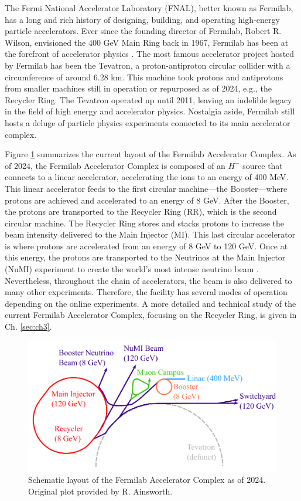 The Fermi National Accelerator Laboratory (FNAL), better known as Fermilab, has a long and rich history of designing, building, and operating high-energy particle accelerators. Ever since the founding director of Fermilab, Robert R. Wilson, envisioned the 400 GeV Main Ring back in 1967, Fermilab has been at the forefront of accelerator physics \cite{fermilab1,fermi50,tevatron}. The most famous accelerator project hosted by Fermilab has been the Tevatron, a proton-antiproton circular collider with a circumference of around 6.28 km. This machine took protons and antiprotons from smaller machines still in operation or repurposed as of 2024, e.g., the Recycler Ring. The Tevatron operated up until 2011, leaving an indelible legacy in the field of high energy and accelerator physics. Nostalgia aside, Fermilab still hosts a deluge of particle physics experiments connected to its main accelerator complex.      

Figure \ref{fig:fac} summarizes the current layout of the Fermilab Accelerator Complex. As of 2024, the Fermilab Accelerator Complex is composed of an $H^-$ source that connects to a linear accelerator, accelerating the ions to an energy of 400 MeV. This linear accelerator feeds to the first circular machine---the Booster---where protons are achieved and accelerated to an energy of 8 GeV. After the Booster, the protons are transported to the Recycler Ring (RR), which is the second circular machine. The Recycler Ring stores and stacks protons to increase the beam intensity delivered to the Main Injector (MI). This last circular accelerator is where protons are accelerated from an energy of 8 GeV to 120 GeV. Once at this energy, the protons are transported to the Neutrinos at the Main Injector (NuMI) experiment to create the world's most intense neutrino beam \cite{numi1}. Nevertheless, throughout the chain of accelerators, the beam is also delivered to many other experiments. Therefore, the facility has several modes of operation depending on the online experiments. A more detailed and technical study of the current Fermilab Accelerator Complex, focusing on the Recycler Ring, is given in Ch. \ref{sec:ch3}.   
\begin{figure}[H]
    \centering
    \includegraphics[width=\columnwidth]{chapter1/complex.png}
    \caption{Schematic layout of the Fermilab Accelerator Complex as of 2024. Original plot provided by R. Ainsworth.}
    \label{fig:fac}
    \vspace{-1.25em}
 \end{figure}

